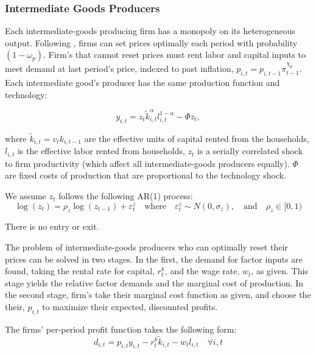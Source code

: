 \documentclass[article,11pt,letterpaper,fleqn]{article}
\theoremstyle{definition}
\numberwithin{equation}{section}
\newcommand{\cn}{\citeasnoun} %
\begin{document}
\subsubsection{Intermediate Goods Producers}

Each intermediate-goods producing firm has a monopoly on its heterogeneous output.  Following \cn{Calvo1983}, firms can set prices optimally each period with probability $(1-\omega_{p})$.  Firm's that cannot reset prices must rent labor and capital inputs to meet demand at last period's price, indexed to past inflation, $p_{i,t}=p_{i,t-1}\pi_{t-1}^{\chi_{p}}$.  Each intermediate good's producer has the same production function and technology:

\begin{equation}
\label{int_prodfunc}
y_{i,t}=z_{t}\tilde{k}_{i,t}^{\alpha}l_{i,t}^{1-\alpha} - \Phi z_{t},
\end{equation} 

\noindent\noindent where $\tilde{k}_{i,t}=v_{t}k_{i,t-1}$ are the effective units of capital rented from the households, $l_{i,t}$ is the effective labor rented from households, $z_{t}$ is a serially correlated shock to firm productivity (which affect all intermediate-goods producers equally). $\Phi$ are fixed costs of production that are proportional to the technology shock. 

We assume $z_{t}$ follows the following AR(1) process:
\begin{equation}\label{EqProdShock}
   \log(z_{t}) = \rho_z\log(z_{t-1}) + \varepsilon^{z}_{t} \quad\text{where}\quad\varepsilon^{z}_{t}\sim N(0,\sigma_z), \quad\text{and}\quad \rho_z\in[0,1)
\end{equation}

There is no entry or exit.

The problem of intermediate-goods producers who can optimally reset their prices can be solved in two stages.  In the first, the demand for factor inputs are found, taking the rental rate for capital, $r_{t}^{k}$, and the wage rate, $w_{t}$, as given.  This stage yields the relative factor demands and the marginal cost of production.  In the second stage, firm's take their marginal cost function as given, and choose the their, $p_{i,t}$ to maximize their expected, discounted profits.

The firms' per-period profit function takes the following form:
\begin{equation}
   d_{i,t} = p_{i,t}y_{i,t} - r_t^k\tilde{k}_{i,t} - w_t l_{i,t} \quad\forall i,t
\end{equation}
\end{document}
